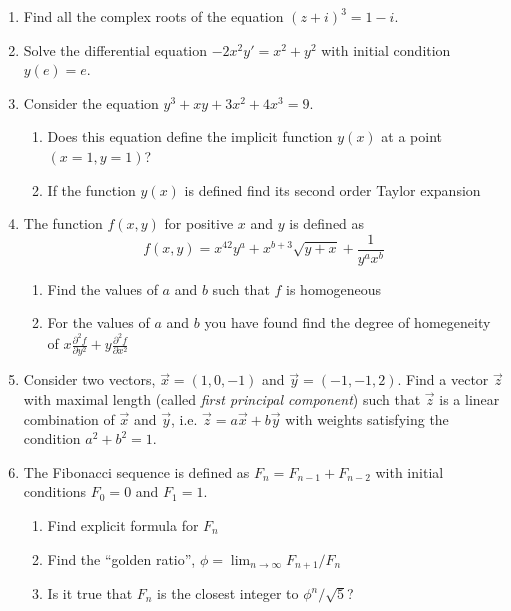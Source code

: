 \documentclass[12pt,a4paper]{article}
\begin{document}
\begin{enumerate}

\item Find all the complex roots of the equation $(z+i)^3=1-i$.

\item Solve the differential equation $-2x^2y'=x^2+y^2$ with initial condition $y(e)=e$.

\item Consider the equation $y^3+xy+3x^2+4x^3=9$. 
\begin{enumerate}
\item Does this equation define the implicit function $y(x)$ at a point $(x=1,y=1)$?
\item If the function $y(x)$ is defined find its second order Taylor expansion
\end{enumerate}

\item The function $f(x,y)$ for positive $x$ and $y$ is defined as
\[
f(x,y)=x^{42}y^a + x^{b+3}\sqrt{y+x}+\frac{1}{y^a x^b}
\]

\begin{enumerate}
\item Find the values of $a$ and $b$ such that $f$ is homogeneous
\item For the values of  $a$ and $b$ you have found find the degree of homegeneity of $x\frac{\partial^2 f}{\partial y^2} +y\frac{\partial^2 f}{\partial x^2}$
\end{enumerate}

\item Consider two vectors, $\vec{x}=(1,0,-1)$ and $\vec{y}=(-1,-1,2)$. Find a vector $\vec{z}$ with maximal length (called \textit{first principal component}) such that $\vec{z}$ is a linear combination of $\vec{x}$ and $\vec{y}$, i.e. $\vec{z}=a \vec{x} + b \vec{y}$ with weights satisfying the condition $a^2+b^2=1$.

\item The Fibonacci sequence is defined as $F_n=F_{n-1}+F_{n-2}$ with initial conditions $F_0=0$ and $F_1=1$. 
\begin{enumerate}
\item Find explicit formula for $F_n$
\item Find the ``golden ratio'', $\phi=\lim_{n\to\infty} F_{n+1}/F_n$
\item Is it true that $F_n$ is the closest integer to $\phi^n/\sqrt{5}$?
\end{enumerate}



\end{enumerate}
\end{document}

